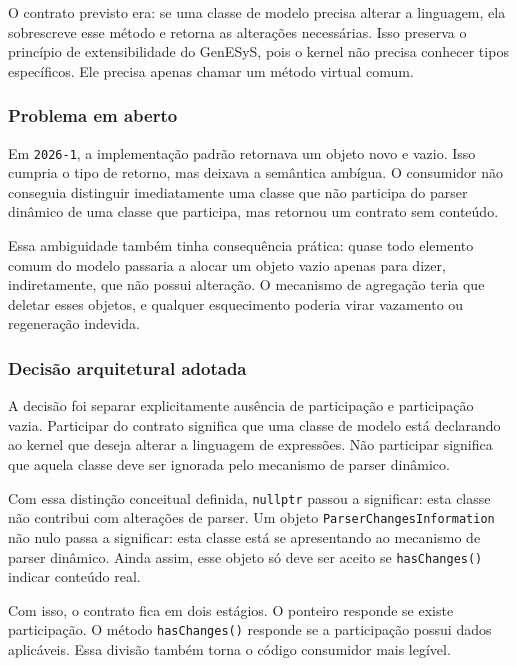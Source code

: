 \documentclass[12pt,a4paper]{article}
\begin{document}
O contrato previsto era: se uma classe de modelo precisa alterar a linguagem, ela sobrescreve esse m\'etodo e retorna as altera\c{c}\~oes necess\'arias. Isso preserva o princ\'ipio de extensibilidade do GenESyS, pois o kernel n\~ao precisa conhecer tipos espec\'ificos. Ele precisa apenas chamar um m\'etodo virtual comum.

\subsubsection{Problema em aberto}

Em \texttt{2026-1}, a implementa\c{c}\~ao padr\~ao retornava um objeto novo e vazio. Isso cumpria o tipo de retorno, mas deixava a sem\^antica amb\'igua. O consumidor n\~ao conseguia distinguir imediatamente uma classe que n\~ao participa do parser din\^amico de uma classe que participa, mas retornou um contrato sem conte\'udo.

Essa ambiguidade tamb\'em tinha consequ\^encia pr\'atica: quase todo elemento comum do modelo passaria a alocar um objeto vazio apenas para dizer, indiretamente, que n\~ao possui altera\c{c}\~ao. O mecanismo de agrega\c{c}\~ao teria que deletar esses objetos, e qualquer esquecimento poderia virar vazamento ou regenera\c{c}\~ao indevida.

\subsubsection{Decis\~ao arquitetural adotada}

A decis\~ao foi separar explicitamente aus\^encia de participa\c{c}\~ao e participa\c{c}\~ao vazia. Participar do contrato significa que uma classe de modelo est\'a declarando ao kernel que deseja alterar a linguagem de express\~oes. N\~ao participar significa que aquela classe deve ser ignorada pelo mecanismo de parser din\^amico.

Com essa distin\c{c}\~ao conceitual definida, \texttt{nullptr} passou a significar: esta classe n\~ao contribui com altera\c{c}\~oes de parser. Um objeto \texttt{ParserChangesInformation} n\~ao nulo passa a significar: esta classe est\'a se apresentando ao mecanismo de parser din\^amico. Ainda assim, esse objeto s\'o deve ser aceito se \texttt{hasChanges()} indicar conte\'udo real.

Com isso, o contrato fica em dois est\'agios. O ponteiro responde se existe participa\c{c}\~ao. O m\'etodo \texttt{hasChanges()} responde se a participa\c{c}\~ao possui dados aplic\'aveis. Essa divis\~ao tamb\'em torna o c\'odigo consumidor mais leg\'ivel.
\end{document}

